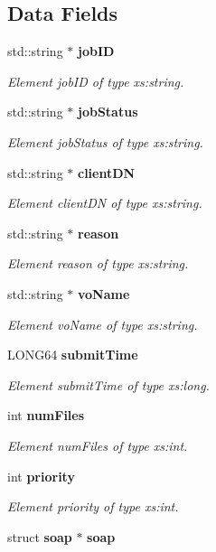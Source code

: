 \subsection*{Data Fields}
\begin{DoxyCompactItemize}
\item 
std::string $\ast$ {\bf jobID}
\begin{DoxyCompactList}\small\item\em Element jobID of type xs:string. \item\end{DoxyCompactList}\item 
std::string $\ast$ {\bf jobStatus}
\begin{DoxyCompactList}\small\item\em Element jobStatus of type xs:string. \item\end{DoxyCompactList}\item 
std::string $\ast$ {\bf clientDN}
\begin{DoxyCompactList}\small\item\em Element clientDN of type xs:string. \item\end{DoxyCompactList}\item 
std::string $\ast$ {\bf reason}
\begin{DoxyCompactList}\small\item\em Element reason of type xs:string. \item\end{DoxyCompactList}\item 
std::string $\ast$ {\bf voName}
\begin{DoxyCompactList}\small\item\em Element voName of type xs:string. \item\end{DoxyCompactList}\item 
LONG64 {\bf submitTime}
\begin{DoxyCompactList}\small\item\em Element submitTime of type xs:long. \item\end{DoxyCompactList}\item 
int {\bf numFiles}
\begin{DoxyCompactList}\small\item\em Element numFiles of type xs:int. \item\end{DoxyCompactList}\item 
int {\bf priority}
\begin{DoxyCompactList}\small\item\em Element priority of type xs:int. \item\end{DoxyCompactList}\item 
struct {\bf soap} $\ast$ {\bf soap}\label{classtransfer____JobStatus_ad58a9cf654b293b8f5115aef6da414f5}


\end{DoxyCompactItemize}
